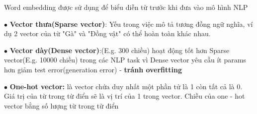 \documentclass[final,letterpaper,twoside,12pt]{report}
\begin{document}
Word embedding được sử dụng để biểu diễn từ trước khi đưa vào mô hình NLP

$\bullet$ \textbf{Vector thưa(Sparse vector)}: Yếu trong việc mô tả tương đồng ngữ nghĩa, ví dụ 2 vector của từ "Gà" và "Đồng vật" có thể hoàn toàn khác nhau.

$\bullet$ \textbf{Vector dày(Dense vector)}:(E.g. 300 chiều) hoạt động tốt hơn Sparse vector(E.g. 10000 chiều) trong các NLP task vì Dense vector yêu cầu ít params hơn giảm test error(generation error) - \textbf{tránh overfitting}

$\bullet$ \textbf{One-hot vector: }là vector chứa duy nhất một phần tử là 1 còn tất cả là 0. Giá trị của từ trong từ điển sẽ
là vị trí của 1 trong vector. Chiều của one - hot vector bằng
số lượng từ trong từ điển

\begin{center}

\end{center}
\end{document}

